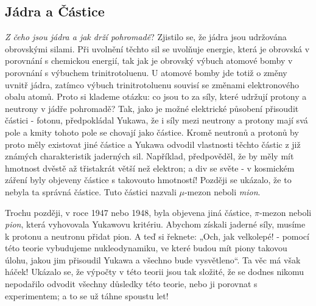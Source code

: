     \subsection{Jádra a Částice}\label{fyz:IchapIIsecIVssecIV}     
      \emph{Z čeho jsou jádra a jak drží pohromadě}? Zjistilo se, že jádra jsou udržována obrovskými
      silami. Při uvolnění těchto sil se uvolňuje energie, která je obrovská v porovnání s chemickou
      energií, tak jak je obrovský výbuch atomové bomby v porovnání s výbuchem trinitrotoluenu. U
      atomové bomby jde totiž o změny uvnitř jádra, zatímco výbuch trinitrotoluenu souvisí se
      změnami elektronového obalu atomů. Proto si klademe otázku: co jsou to za síly, které udržují
      protony a neutrony v jádře pohromadě? Tak, jako je možné elektrické působení přisoudit částici
      - fotonu, předpokládal Yukawa, že i síly mezi neutrony a protony mají svá pole a kmity tohoto
      pole se chovají jako částice. Kromě neutronů a protonů by proto měly existovat jiné částice a
      Yukawa odvodil vlastnosti těchto částic z již známých charakteristik jaderných sil. Například,
      předpověděl, že by měly mít hmotnost dvěstě až třistakrát větší než elektron; a div se světe -
      v kosmickém záření byly objeveny částice s takovouto hmotností! Později se ukázalo, že to
      nebyla ta správná částice. Tuto částici nazvali \(\mu\text{-mezon}\) neboli \emph{mion}.

      Trochu později, v roce 1947 nebo 1948, byla objevena jiná částice, \(\pi\text{-mezon}\) neboli
      \emph{pion}, která vyhovovala Yukawovu kritériu. Abychom získali jaderné síly, musíme k
      protonu a neutronu přidat pion. A teď si řeknete: „Och, jak velkolepé! - pomocí této teorie
      vybudujeme nukleodynamiku, ve které budou mít piony takovou úlohu, jakou jim přisoudil Yukawa
      a všechno bude vysvětleno“. Ta věc má však háček! Ukázalo se, že výpočty v této teorii jsou
      tak složité, že se dodnes nikomu nepodařilo odvodit všechny důsledky této teorie, nebo ji
      porovnat s experimentem; a to se už táhne spoustu let!
      
